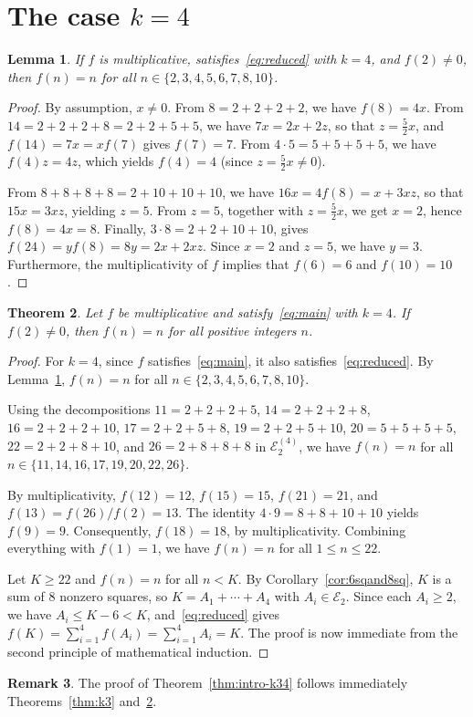 \documentclass[11pt,a4paper]{amsart}
\newcommand{\E}{\mathcal{E}}
\theoremstyle{plain}
\newtheorem{theorem}{Theorem}[section]
\newtheorem{lemma}[theorem]{Lemma}
\theoremstyle{definition}
\newtheorem{remark}[theorem]{Remark}
\begin{document}
\section{The case \texorpdfstring{$k = 4$}{k=4}}\label{sec:k4}

\begin{lemma}\label{lem:k4-base}
If $f$ is multiplicative, satisfies~\eqref{eq:reduced} with $k = 4$, and $f(2) \neq 0$, then $f(n)=n$ for all $n\in \{2,3,4,5,6,7,8,10\}$.
\end{lemma}

\begin{proof}
By assumption, $x\neq 0$. From $8 = 2+2+2+2$, we have $f(8) = 4x$. From $14 = 2+2+2+8 = 2+2+5+5$, we have $7x = 2x + 2z$, so that $z = \frac{5}{2} x$, and $f(14) = 7x = x f(7)$ gives $f(7) = 7$. From $4\cdot 5 = 5+5+5+5$, we have $ f(4)z=4z $, which yields $f(4) = 4$ (since $z = \frac{5}{2} x\neq 0$).

From $8+8+8+8 = 2+10+10+10$, we have $ 16x=4f(8) = x + 3xz$, so that $15x=3xz$, yielding $z = 5$. From $z = 5$, together with  $z = \frac{5}{2} x$, we get $x=2$, hence $f(8) =4x= 8$. Finally, $3\cdot 8 = 2+2+10+10$, gives $f(24) = y f(8) = 8y= 2x + 2xz$. Since $x=2$ and $z=5$, we have $y = 3$. Furthermore, the multiplicativity of $f$ implies that $f(6) = 6$ and $f(10) = 10$.
\end{proof}

\begin{theorem}\label{thm:k4}
Let $f$ be multiplicative and satisfy~\eqref{eq:main} with $k = 4$. If $f(2) \neq 0$, then $f(n) = n$ for all positive integers $n$.
\end{theorem}
\begin{proof}
For $k = 4$, since $f$ satisfies~\eqref{eq:main}, it also satisfies~\eqref{eq:reduced}. By Lemma~\ref{lem:k4-base}, $f(n)=n$ for all $n \in \{2,3,4,5,6,7,8,10\}$.


Using the decompositions $11=2+2+2+5$, $14=2+2+2+8$, $16=2+2+2+10$, $17=2+2+5+8$, $19=2+2+5+10$, $20=5+5+5+5$, $22=2+2+8+10$, 
and $26=2+8+8+8$ in $\E_2^{(4)}$, we have 
$f(n)=n$ for all $n \in \{11,14,16,17,19,20,22,26\}$.


By multiplicativity, $f(12)=12$, $f(15)=15$, $f(21)=21$, and $f(13)= f(26)/f(2) = 13$. The identity $4\cdot 9=8+8+10+10$ yields $f(9)=9$. Consequently, $f(18)=18$, by multiplicativity. Combining everything with $f(1)=1$, we have $f(n)=n$ for all $1\leq n \leq 22$.


Let $K \ge 22$ and $f(n)=n$ for all $n<K$. By Corollary~\ref{cor:6sqand8sq}, $K$ is a sum of $8$ nonzero squares, so $K = A_1 + \cdots + A_4$ with $A_i \in \E_2$. Since each $A_i\ge 2$, we have $A_i \leq K-6 < K$, and~\eqref{eq:reduced} gives $f(K) =\sum_{i=1}^{4}f(A_i) =\sum_{i=1}^{4} A_i =K$. The proof is now immediate from the second principle of mathematical induction.
\end{proof}
\begin{remark}
    The proof of Theorem~\ref{thm:intro-k34} follows immediately Theorems~\ref{thm:k3} and~\ref{thm:k4}.
\end{remark}
\end{document}
